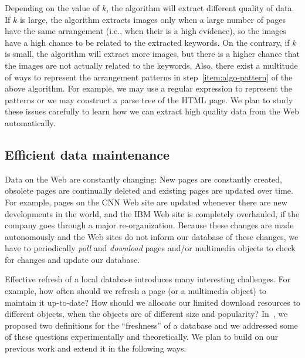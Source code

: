 Depending on the value of $k$, the algorithm will extract 
different quality of data.
If $k$ is large, the algorithm extracts images only when a large number
of pages have the same arrangement (i.e., when their is a high evidence), 
so the images have a high chance to be related to the extracted keywords.
On the contrary, if $k$ is small, the algorithm will extract more
images, but there is a higher chance that the images are not
actually related to the keywords.
Also, 
there exist a multitude of ways to represent the arrangement patterns
in step~\ref{item:algo-pattern} of the above algorithm.
For example, we may use a regular expression to represent the patterns
or we may construct a parse tree of the HTML page.
We plan to study these issues carefully to learn how we can extract
high quality data from the Web automatically.


\subsection{Efficient data maintenance}
Data on the Web are constantly changing: New pages
are constantly created, obsolete pages are continually deleted
and existing pages are updated over time.
For example, pages on the CNN Web site are updated
whenever there are new developments in the world,
and the IBM Web site is completely overhauled,
if the company goes through a major re-organization.
Because these changes
are made autonomously and the Web sites do not inform our database
of these changes, we have to periodically {\em poll} 
and {\em download} pages and/or multimedia objects
to check for changes and update our database.

Effective refresh of a local database introduces many
interesting challenges. For example, how often should we
refresh a page (or a multimedia object) to maintain it up-to-date?
How should we allocate our limited download resources to different
objects, when the objects are of different size and popularity?
In~\cite{cho00a}, we proposed two definitions for the ``freshness''
of a database and we addressed some of these questions
experimentally and theoretically. We plan to build on our previous work 
and extend it in the following ways.

